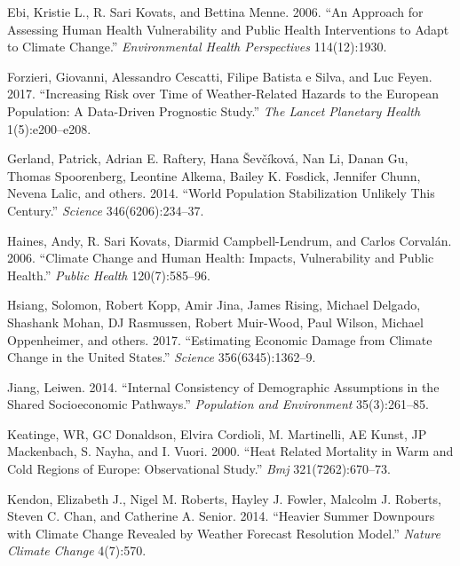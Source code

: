 \documentclass[12pt,]{article}
\begin{document}
\leavevmode\hypertarget{ref-ebi2006approach}{}%
Ebi, Kristie L., R. Sari Kovats, and Bettina Menne. 2006. ``An Approach
for Assessing Human Health Vulnerability and Public Health Interventions
to Adapt to Climate Change.'' \emph{Environmental Health Perspectives}
114(12):1930.

\leavevmode\hypertarget{ref-forzieri2017increasing}{}%
Forzieri, Giovanni, Alessandro Cescatti, Filipe Batista e Silva, and Luc
Feyen. 2017. ``Increasing Risk over Time of Weather-Related Hazards to
the European Population: A Data-Driven Prognostic Study.'' \emph{The
Lancet Planetary Health} 1(5):e200--e208.

\leavevmode\hypertarget{ref-gerland2014world}{}%
Gerland, Patrick, Adrian E. Raftery, Hana Ševčíková, Nan Li, Danan Gu,
Thomas Spoorenberg, Leontine Alkema, Bailey K. Fosdick, Jennifer Chunn,
Nevena Lalic, and others. 2014. ``World Population Stabilization
Unlikely This Century.'' \emph{Science} 346(6206):234--37.

\leavevmode\hypertarget{ref-haines2006climate}{}%
Haines, Andy, R. Sari Kovats, Diarmid Campbell-Lendrum, and Carlos
Corvalán. 2006. ``Climate Change and Human Health: Impacts,
Vulnerability and Public Health.'' \emph{Public Health} 120(7):585--96.

\leavevmode\hypertarget{ref-hsiang2017estimating}{}%
Hsiang, Solomon, Robert Kopp, Amir Jina, James Rising, Michael Delgado,
Shashank Mohan, DJ Rasmussen, Robert Muir-Wood, Paul Wilson, Michael
Oppenheimer, and others. 2017. ``Estimating Economic Damage from Climate
Change in the United States.'' \emph{Science} 356(6345):1362--9.

\leavevmode\hypertarget{ref-jiang2014internal}{}%
Jiang, Leiwen. 2014. ``Internal Consistency of Demographic Assumptions
in the Shared Socioeconomic Pathways.'' \emph{Population and
Environment} 35(3):261--85.

\leavevmode\hypertarget{ref-keatinge2000heat}{}%
Keatinge, WR, GC Donaldson, Elvira Cordioli, M. Martinelli, AE Kunst, JP
Mackenbach, S. Nayha, and I. Vuori. 2000. ``Heat Related Mortality in
Warm and Cold Regions of Europe: Observational Study.'' \emph{Bmj}
321(7262):670--73.

\leavevmode\hypertarget{ref-kendon2014heavier}{}%
Kendon, Elizabeth J., Nigel M. Roberts, Hayley J. Fowler, Malcolm J.
Roberts, Steven C. Chan, and Catherine A. Senior. 2014. ``Heavier Summer
Downpours with Climate Change Revealed by Weather Forecast Resolution
Model.'' \emph{Nature Climate Change} 4(7):570.
\end{document}
